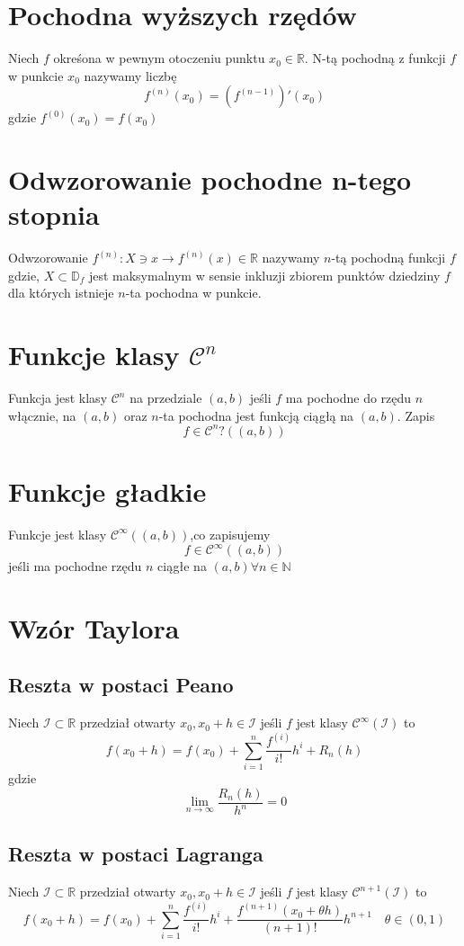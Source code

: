 \documentclass[11pt]{article}
\begin{document}
\section{Pochodna wyższych rzędów}
Niech $f$ okreśona w pewnym otoczeniu punktu $x_0 \in \mathbb{R}$. N-tą pochodną z funkcji $f$ w punkcie $x_0$ nazywamy liczbę $$f^{(n)}(x_0) = (f^{(n-1)})'(x_0)$$ gdzie $f^{(0)}(x_0) = f(x_0)$

\section{Odwzorowanie pochodne n-tego stopnia}
Odwzorowanie $f^{(n)} : X \ni x \to f^{(n)}(x) \in \mathbb{R}$ nazywamy $n$-tą pochodną funkcji $f$ gdzie,
$ X \subset \mathbb{D}_f$ jest maksymalnym w sensie inkluzji zbiorem punktów dziedziny $f$ dla których istnieje $n$-ta pochodna w punkcie.

\section{Funkcje klasy $\mathcal{C}^n$}
Funkcja jest klasy $\mathcal{C}^n$ na przedziale $(a,b)$ jeśli $f$ ma pochodne do rzędu $n$ włącznie, na $(a,b)$ oraz $n$-ta pochodna jest funkcją ciągłą na $(a,b)$. Zapis
$$ f \in \mathcal{C}^n?((a,b))$$
\section{Funkcje gładkie}
Funkcje jest klasy $\mathcal{C}^\infty((a,b))$,co zapisujemy $$ f \in \mathcal{C}^\infty((a,b))$$ jeśli ma pochodne rzędu $n$ ciągłe na $(a,b) \forall n \in \mathbb{N}$

\section{Wzór Taylora}
\subsection{Reszta w postaci Peano}
Niech $\mathcal{I} \subset \mathbb{R}$ przedział otwarty $x_0,x_0+h \in \mathcal{I}$ jeśli $f$ jest klasy $\mathcal{C}^\infty(\mathcal{I})$ to $$f(x_0 + h) = f(x_0) + \sum_{i = 1}^{n}{\frac{f^{(i)}}{i!} h^i} + R_n(h)$$ gdzie
$$ \lim_{n \to \infty}{\frac{R_n(h)}{h^n}} = 0$$
\subsection{Reszta w postaci Lagranga}
Niech $\mathcal{I} \subset \mathbb{R}$ przedział otwarty $x_0,x_0+h \in \mathcal{I}$ jeśli $f$ jest klasy $\mathcal{C}^{n+1}(\mathcal{I})$ to
$$f(x_0 + h) = f(x_0) + \sum_{i = 1}^{n}{\frac{f^{(i)}}{i!} h^i} + \frac{f^{(n+1)}(x_0 + \theta h)}{(n+1)!}h^{n+1} \quad \theta \in (0,1)$$
\end{document}
